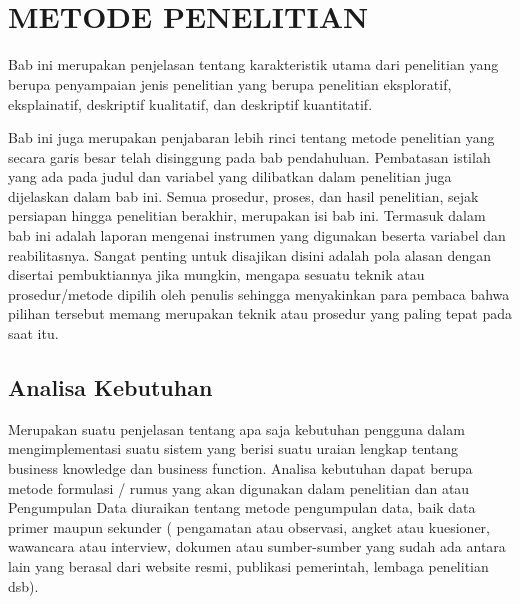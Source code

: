 
\chapter[METODE PENELITIAN]{\\ METODE PENELITIAN}

Bab ini merupakan penjelasan tentang karakteristik utama dari penelitian yang berupa penyampaian jenis penelitian yang berupa penelitian eksploratif, eksplainatif, deskriptif kualitatif,  dan deskriptif kuantitatif.

Bab ini juga merupakan penjabaran lebih rinci tentang metode penelitian yang secara garis besar telah disinggung pada bab pendahuluan. Pembatasan istilah yang ada pada judul dan variabel yang dilibatkan dalam penelitian juga dijelaskan dalam bab ini. Semua prosedur, proses, dan hasil penelitian, sejak persiapan hingga penelitian berakhir, merupakan isi bab ini. Termasuk dalam bab ini adalah laporan mengenai instrumen yang digunakan beserta variabel dan reabilitasnya. Sangat penting untuk disajikan disini adalah pola alasan dengan disertai pembuktiannya jika mungkin, mengapa sesuatu teknik atau prosedur/metode dipilih oleh penulis sehingga menyakinkan para pembaca bahwa pilihan tersebut memang merupakan teknik atau prosedur yang paling tepat pada saat itu.

\section{Analisa Kebutuhan}
\begin{sectioncontent}
    \hspace{\parindent}Merupakan suatu penjelasan tentang apa saja kebutuhan pengguna dalam mengimplementasi suatu sistem yang berisi suatu uraian lengkap tentang business knowledge dan business function. Analisa kebutuhan dapat berupa metode formulasi / rumus yang akan digunakan dalam penelitian dan atau Pengumpulan Data diuraikan tentang metode pengumpulan data, baik data primer maupun sekunder ( pengamatan atau observasi, angket atau kuesioner, wawancara atau interview, dokumen atau sumber-sumber yang sudah ada antara lain yang berasal dari website resmi, publikasi pemerintah, lembaga penelitian dsb).
\end{sectioncontent}

